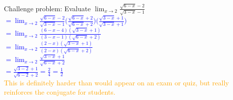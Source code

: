 \documentclass{ximera}
\begin{document}
\begin{exercise}

  Challenge problem: Evaluate $\displaystyle \lim_{x\rightarrow 2} \frac{\sqrt{6-x}-2}{\sqrt{3-x}-1} $\\
  \textcolor{blue}{ $=\displaystyle \lim_{x\rightarrow 2} \frac{\sqrt{6-x}-2}{\sqrt{3-x}-1}\bigg(\frac{\sqrt{6-x}+2}{\sqrt{6-x}+2}\bigg)\bigg(\frac{\sqrt{3-x}+1}{\sqrt{3-x}+1}\bigg)$\\
$=\displaystyle \lim_{x\rightarrow 2}\frac{(6-x-4)(\sqrt{3-x}+1)}{(3-x-1)(\sqrt{6-x}+2)}$\\
$=\displaystyle \lim_{x\rightarrow 2}\frac{(2-x)(\sqrt{3-x}+1)}{(2-x)(\sqrt{6-x}+2)}$\\
$=\displaystyle \lim_{x\rightarrow 2}\frac{\sqrt{3-x}+1}{\sqrt{6-x}+2}$\\
$\displaystyle =\frac{\sqrt{3-2}+1}{\sqrt{6-2}+2}=\frac{2}{4}=\frac12$}\\
\textcolor{orange}{This is definitely harder than would appear on an exam or quiz, but really reinforces the conjugate for students.}
     

\end{exercise}
\end{document}
